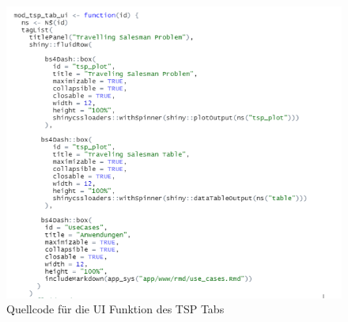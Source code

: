 \begin{figure}[H]
 \centering
 \includegraphics[scale=.7]{"images/05_Tsp/ui_mod_tsp_tab.png"}
 \caption{Quellcode für die UI Funktion des TSP Tabs}
 \label{fig:ui_mod_tsp_tab}
\end{figure}

